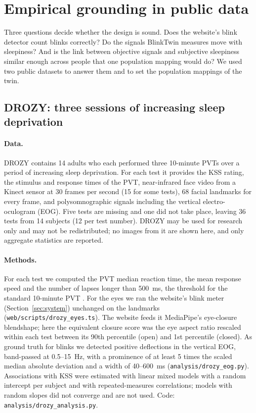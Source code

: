 \section{Empirical grounding in public data}
\label{sec:grounding}

Three questions decide whether the design is sound. Does the website's blink detector count blinks correctly? Do the signals BlinkTwin measures move with sleepiness? And is the link between objective signals and subjective sleepiness similar enough across people that one population mapping would do? We used two public datasets to answer them and to set the population mappings of the twin.

\subsection{DROZY: three sessions of increasing sleep deprivation}
\paragraph{Data.} DROZY \citep{massoz2016ulg} contains 14 adults who each performed three 10-minute PVTs over a period of increasing sleep deprivation. For each test it provides the KSS rating, the stimulus and response times of the PVT, near-infrared face video from a Kinect sensor at 30 frames per second (15 for some tests), 68 facial landmarks for every frame, and polysomnographic signals including the vertical electro-oculogram (EOG). Five tests are missing and one did not take place, leaving 36 tests from 14 subjects (12 per test number). DROZY may be used for research only and may not be redistributed; no images from it are shown here, and only aggregate statistics are reported.

\paragraph{Methods.} For each test we computed the PVT median reaction time, the mean response speed and the number of lapses longer than 500~ms, the threshold for the standard 10-minute PVT \citep{basner2011maximizing}. For the eyes we ran the website's blink meter (Section~\ref{sec:system}) unchanged on the landmarks (\texttt{web/scripts/drozy\_eyes.ts}). The website feeds it MediaPipe's eye-closure blendshape; here the equivalent closure score was the eye aspect ratio \citep{soukupova2016real} rescaled within each test between its 90th percentile (open) and 1st percentile (closed). As ground truth for blinks we detected positive deflections in the vertical EOG, band-passed at 0.5--15~Hz, with a prominence of at least 5 times the scaled median absolute deviation and a width of 40--600~ms (\texttt{analysis/drozy\_eog.py}). Associations with KSS were estimated with linear mixed models with a random intercept per subject and with repeated-measures correlations; models with random slopes did not converge and are not used. Code: \texttt{analysis/drozy\_analysis.py}.

